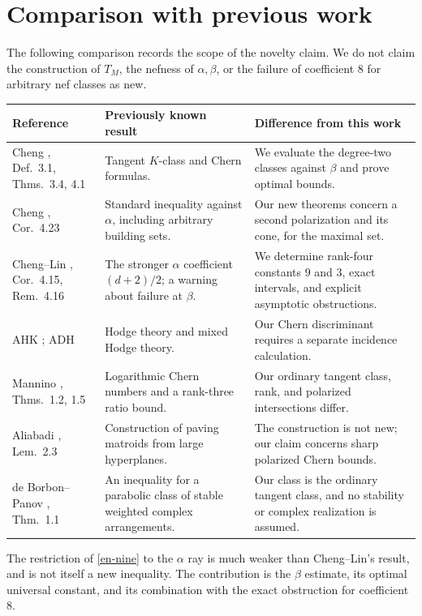 \documentclass[12pt]{amsart}
\theoremstyle{definition}
\theoremstyle{remark}
\numberwithin{equation}{section}
\begin{document}
\section{Comparison with previous work}
The following comparison records the scope of the novelty claim. We do not claim the construction of $T_M$, the nefness of $\alpha,\beta$, or the failure of coefficient $8$ for arbitrary nef classes as new.
\begin{center}\small
\begin{tabularx}{\textwidth}{@{}p{3.0cm}XX@{}}
\toprule
Reference&Previously known result&Difference from this work\\\midrule
Cheng \cite{Che}, Def.~3.1, Thms.~3.4, 4.1&Tangent $K$-class and Chern formulas.&We evaluate the degree-two classes against $\beta$ and prove optimal bounds.\\
Cheng \cite{CheG}, Cor.~4.23&Standard inequality against $\alpha$, including arbitrary building sets.&Our new theorems concern a second polarization and its cone, for the maximal set.\\
Cheng--Lin \cite{CL}, Cor.~4.15, Rem.~4.16&The stronger $\alpha$ coefficient $(d+2)/2$; a warning about failure at $\beta$.&We determine rank-four constants $9$ and $3$, exact intervals, and explicit asymptotic obstructions.\\
AHK \cite{AHK}; ADH \cite{ADH}&Hodge theory and mixed Hodge theory.&Our Chern discriminant requires a separate incidence calculation.\\
Mannino \cite{Man}, Thms.~1.2, 1.5&Logarithmic Chern numbers and a rank-three ratio bound.&Our ordinary tangent class, rank, and polarized intersections differ.\\
Aliabadi \cite{Ali}, Lem.~2.3&Construction of paving matroids from large hyperplanes.&The construction is not new; our claim concerns sharp polarized Chern bounds.\\
de Borbon--Panov \cite{BP}, Thm.~1.1&An inequality for a parabolic class of stable weighted complex arrangements.&Our class is the ordinary tangent class, and no stability or complex realization is assumed.\\
\bottomrule
\end{tabularx}
\end{center}
The restriction of \eqref{en-nine} to the $\alpha$ ray is much weaker than Cheng--Lin's result, and is not itself a new inequality. The contribution is the $\beta$ estimate, its optimal universal constant, and its combination with the exact obstruction for coefficient $8$.
\end{document}
